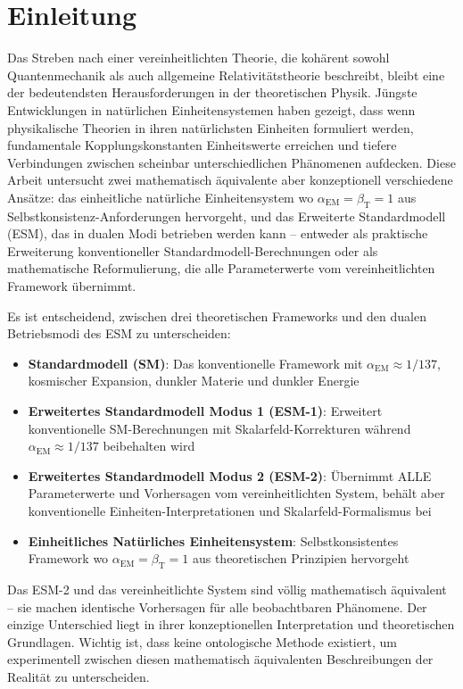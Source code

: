 \documentclass[12pt,a4paper]{article}
\newcommand{\alphaEM}{\alpha_{\text{EM}}}
\newcommand{\betaT}{\beta_{\text{T}}}
\begin{document}
	\section{Einleitung}
	\label{sec:introduction}
	
	Das Streben nach einer vereinheitlichten Theorie, die kohärent sowohl Quantenmechanik als auch allgemeine Relativitätstheorie beschreibt, bleibt eine der bedeutendsten Herausforderungen in der theoretischen Physik. Jüngste Entwicklungen in natürlichen Einheitensystemen haben gezeigt, dass wenn physikalische Theorien in ihren natürlichsten Einheiten formuliert werden, fundamentale Kopplungskonstanten Einheitswerte erreichen und tiefere Verbindungen zwischen scheinbar unterschiedlichen Phänomenen aufdecken. Diese Arbeit untersucht zwei mathematisch äquivalente aber konzeptionell verschiedene Ansätze: das einheitliche natürliche Einheitensystem wo $\alphaEM = \betaT = 1$ aus Selbstkonsistenz-Anforderungen hervorgeht, und das Erweiterte Standardmodell (ESM), das in dualen Modi betrieben werden kann – entweder als praktische Erweiterung konventioneller Standardmodell-Berechnungen oder als mathematische Reformulierung, die alle Parameterwerte vom vereinheitlichten Framework übernimmt.
	
	Es ist entscheidend, zwischen drei theoretischen Frameworks und den dualen Betriebsmodi des ESM zu unterscheiden:
	
	\begin{itemize}
		\item \textbf{Standardmodell (SM)}: Das konventionelle Framework mit $\alphaEM \approx 1/137$, kosmischer Expansion, dunkler Materie und dunkler Energie
		\item \textbf{Erweitertes Standardmodell Modus 1 (ESM-1)}: Erweitert konventionelle SM-Berechnungen mit Skalarfeld-Korrekturen während $\alphaEM \approx 1/137$ beibehalten wird
		\item \textbf{Erweitertes Standardmodell Modus 2 (ESM-2)}: Übernimmt ALLE Parameterwerte und Vorhersagen vom vereinheitlichten System, behält aber konventionelle Einheiten-Interpretationen und Skalarfeld-Formalismus bei
		\item \textbf{Einheitliches Natürliches Einheitensystem}: Selbstkonsistentes Framework wo $\alphaEM = \betaT = 1$ aus theoretischen Prinzipien hervorgeht
	\end{itemize}
	
	Das ESM-2 und das vereinheitlichte System sind völlig mathematisch äquivalent – sie machen identische Vorhersagen für alle beobachtbaren Phänomene. Der einzige Unterschied liegt in ihrer konzeptionellen Interpretation und theoretischen Grundlagen. Wichtig ist, dass keine ontologische Methode existiert, um experimentell zwischen diesen mathematisch äquivalenten Beschreibungen der Realität zu unterscheiden.
	
\end{document}
